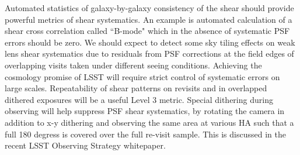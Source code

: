 \documentclass[SE,toc,lsstdraft]{lsstdoc}
\begin{document}
Automated statistics of galaxy-by-galaxy consistency of the shear should provide powerful metrics of shear systematics.  An example is automated calculation of a shear cross correlation called ``B-mode" which in the absence of systematic PSF errors should be zero. We should expect to detect some sky tiling effects on weak lens shear systematics due to residuals from PSF corrections at the field edges of overlapping visits taken under different seeing conditions. Achieving the cosmology promise of LSST will require strict control of systematic errors on large scales. Repeatability of shear patterns on revisits and in overlapped dithered exposures will be a useful Level 3 metric.  Special dithering during observing will help suppress PSF shear systematics, by rotating the camera in addition to x-y dithering and observing the same area at various HA such that a full 180 degress is covered over the full re-visit sample. This is discussed in the recent LSST Observing Strategy whitepaper.  %


\end{document}
